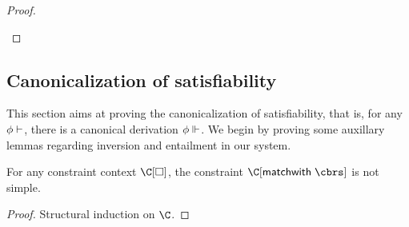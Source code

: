 \documentclass[acmsmall,screen,nonacm,review]{acmart}
\begin{document}
\begin{proof}
\begin{itemize}
      \begin{llproof}
	\continueltPf{\cmeasure {\cpapp \x \ren \ueqs \t}}{}
      \end{llproof}
\end{itemize}
\end{proof}

\subsection{Canonicalization of satisfiability}

This section aims at proving the canonicalization of satisfiability, that is,
for any $\phi \vdash \relax$, there is a canonical derivation $\phi \Vdash \relax$.
%
We begin by proving some auxillary lemmas regarding inversion and
entailment in our system.

\begin{lemma}
  \label{lem:match-is-not-simple}
  For any constraint context $\C\where{\square}$,
  the constraint $\C\where{\cmatch \t \cbrs}$ is not simple.
  \begin{proof}
    Structural induction on $\C$.
  \end{proof}
\end{lemma}

\newcommand{\simplePf}[2]{\Pf{}{}{#1 \simple}{#2}}
\newcommand{\nsimplePf}[2]{\Pf{}{\neg}{#1 \simple}{#2}}
\newcommand{\shapePf}[4]{\Pf{}{}{\Cshape {#1} {#2} {#3}}{#4}}
\end{document}
